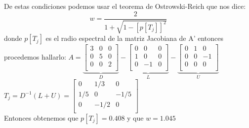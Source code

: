 \begin{frame}
    \begin{solution}
       De estas condiciones podemos usar el teorema de Ostrowski-Reich que nos dice:
        \begin{equation*}
            w=\frac{2}{1+\sqrt{1-[p[T_{j}]]^{2}}}
        \end{equation*}
        donde \begin{math}
            p[T_{j}]
        \end{math}
        es el radio espectral de la matriz Jacobiana de A'
    entonces procedemos hallarlo:
        \begin{math}
          A=  
        \underbrace{ \begin{bmatrix}
        3 & 0 & 0 \\
        0 & 5 & 0 \\
        0 & 0 & 2 \\
        \end{bmatrix}}_{\displaystyle D}
        -
        \underbrace{\begin{bmatrix}
        0 & 0 & 0 \\
        1 & 0 & 0 \\
        0 & -1 & 0 \\
        \end{bmatrix}}_{\displaystyle L}
        -
        \underbrace{\begin{bmatrix}
        0 & 1 & 0 \\
        0 & 0 & -1 \\
        0 & 0 & 0 \\
        \end{bmatrix}}_{\displaystyle U}
        
        \end{math} 
        \begin{math}
            T_{j}=D^{-1}(L+U)
        =\begin{bmatrix}
            0 & 1/3 & 0 \\
            1/5 & 0 & -1/5 \\
            0 & -1/2 & 0 \\
            \end{bmatrix}
        \end{math}
        \\Entonces obtenemos que
        \begin{math}
            p[T_{j}]=0.408
        \end{math} 
        y que 
        \begin{math}
            w=1.045
        \end{math}
        
    \end{solution}
\end{frame}

